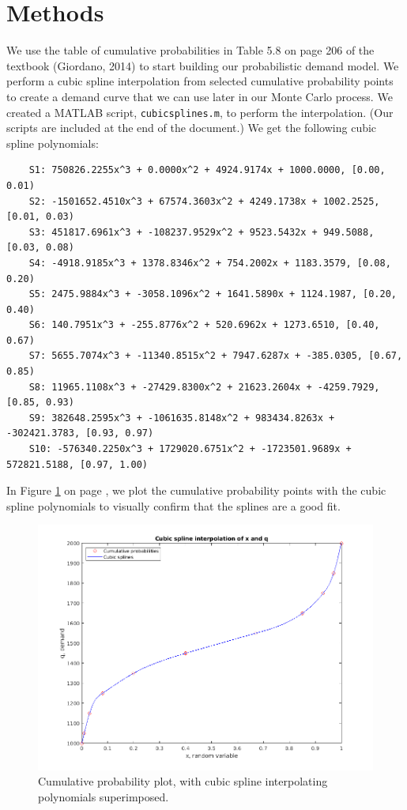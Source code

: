 \documentclass{article}
\begin{document}
    \section*{Methods}
    We use the table of cumulative probabilities in Table 5.8 on page 206 of the textbook (Giordano, 2014) to start building our probabilistic demand model. We perform a cubic spline interpolation from selected cumulative probability points to create a demand curve that we can use later in our Monte Carlo process. We created a MATLAB script, \texttt{cubicsplines.m}, to perform the interpolation. (Our scripts are included at the end of the document.) We get the following cubic spline polynomials:
    \begin{verbatim}
    S1: 750826.2255x^3 + 0.0000x^2 + 4924.9174x + 1000.0000, [0.00, 0.01)
    S2: -1501652.4510x^3 + 67574.3603x^2 + 4249.1738x + 1002.2525, [0.01, 0.03)
    S3: 451817.6961x^3 + -108237.9529x^2 + 9523.5432x + 949.5088, [0.03, 0.08)
    S4: -4918.9185x^3 + 1378.8346x^2 + 754.2002x + 1183.3579, [0.08, 0.20)
    S5: 2475.9884x^3 + -3058.1096x^2 + 1641.5890x + 1124.1987, [0.20, 0.40)
    S6: 140.7951x^3 + -255.8776x^2 + 520.6962x + 1273.6510, [0.40, 0.67)
    S7: 5655.7074x^3 + -11340.8515x^2 + 7947.6287x + -385.0305, [0.67, 0.85)
    S8: 11965.1108x^3 + -27429.8300x^2 + 21623.2604x + -4259.7929, [0.85, 0.93)
    S9: 382648.2595x^3 + -1061635.8148x^2 + 983434.8263x + -302421.3783, [0.93, 0.97)
    S10: -576340.2250x^3 + 1729020.6751x^2 + -1723501.9689x + 572821.5188, [0.97, 1.00)\end{verbatim}
    In Figure \ref{fig:cubicsplines} on page \pageref{fig:cubicsplines}, we plot the cumulative probability points with the cubic spline polynomials to visually confirm that the splines are a good fit.
    \begin{figure}[p]
        \centering
        \includegraphics[width=\textwidth]{img/cubicsplines.png}
        \caption{Cumulative probability plot, with cubic spline interpolating polynomials superimposed.}
        \label{fig:cubicsplines}
    \end{figure}
\end{document}
